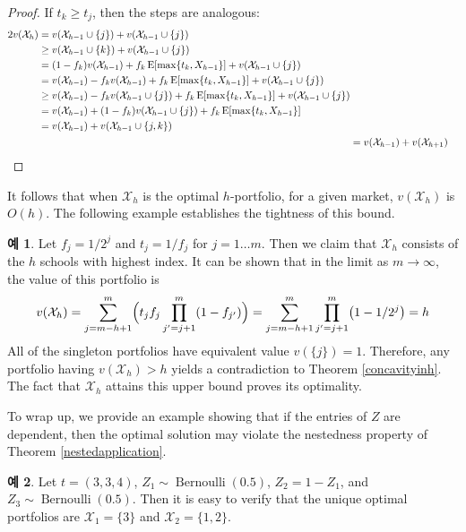 \documentclass[12pt]{article} %
\theoremstyle{definition}
\newtheorem{example}{Example}
\theoremstyle{definition}
\newtheorem{example}{예}
\begin{document}
\begin{proof}
If $t_k \geq t_j$, then the steps are analogous:
\begin{align}
\begin{split}
2 v(\mathcal{X}_h) &= v(\mathcal{X}_{h-1} \cup\{j\}) + v(\mathcal{X}_{h-1} \cup\{j\}) \\
&\geq v(\mathcal{X}_{h-1} \cup\{k\}) + v(\mathcal{X}_{h-1} \cup\{j\}) \\
&= (1 - f_k) v(\mathcal{X}_{h-1}) + f_k \operatorname{E}[\max\{t_k, X_{h-1}\}] +  v(\mathcal{X}_{h-1} \cup\{j\})  \\
&= v(\mathcal{X}_{h-1}) - f_k  v(\mathcal{X}_{h-1}) + f_k \operatorname{E}[\max\{t_k, X_{h-1}\}] +  v(\mathcal{X}_{h-1} \cup\{j\})  \\
&\geq v(\mathcal{X}_{h-1}) - f_k  v(\mathcal{X}_{h-1}\cup\{j\}) + f_k \operatorname{E}[\max\{t_k, X_{h-1}\}] +  v(\mathcal{X}_{h-1} \cup\{j\})  \\
&= v(\mathcal{X}_{h-1}) + (1 - f_k) v(\mathcal{X}_{h-1}\cup\{j\}) + f_k \operatorname{E}[\max\{t_k, X_{h-1}\}]  \\
&= v(\mathcal{X}_{h-1}) + v(\mathcal{X}_{h-1} \cup\{j, k\})
\end{split}\\
&= v(\mathcal{X}_{h-1})  + v(\mathcal{X}_{h+1}) \qedhere
\end{align}
\end{proof}

It follows that when $\mathcal{X}_h$ is the optimal $h$-portfolio, for a given market, $v(\mathcal{X}_h)$ is $O(h)$. The following example establishes the tightness of this bound.

\begin{example}
Let $f_j = 1/2^j$ and $t_j = 1 / f_j$ for $j = 1 \dots m$. Then we claim that $\mathcal{X}_h$ consists of the $h$ schools with highest index. It can be shown that in the limit as $m \to \infty$, the value of this portfolio is 
\begin{equation}
v(\mathcal{X}_h) = \sum_{j= m-h +1}^m \Bigl( t_j f_j \prod_{j' = j+1}^m (1 - f_{j'}) \Bigr) =  \sum_{j= m-h +1}^m \prod_{j' = j+1}^m \bigl(1 - 1/2^j\bigr) = h
\end{equation}
All of the singleton portfolios have equivalent value $v(\{j\}) = 1$. Therefore, any portfolio having $v(\mathcal{X}_h) >h$ yields a contradiction to Theorem \ref{concavityinh}. The fact that $\mathcal{X}_h$ attains this upper bound proves its optimality. 
\end{example}



To wrap up, we provide an example showing that if the entries of $Z$ are dependent, then the optimal solution may violate the nestedness property of Theorem \ref{nestedapplication}.
\begin{example}
Let $t = (3, 3, 4)$, $Z_1 \sim \operatorname{Bernoulli}(0.5)$, $Z_2 = 1 - Z_1$,  and $Z_3 \sim \operatorname{Bernoulli}(0.5)$. Then it is easy to verify that the unique optimal portfolios are $\mathcal{X}_1 = \{3\}$ and $\mathcal{X}_2 = \{1, 2\}$. 
\end{example}
\end{document}
